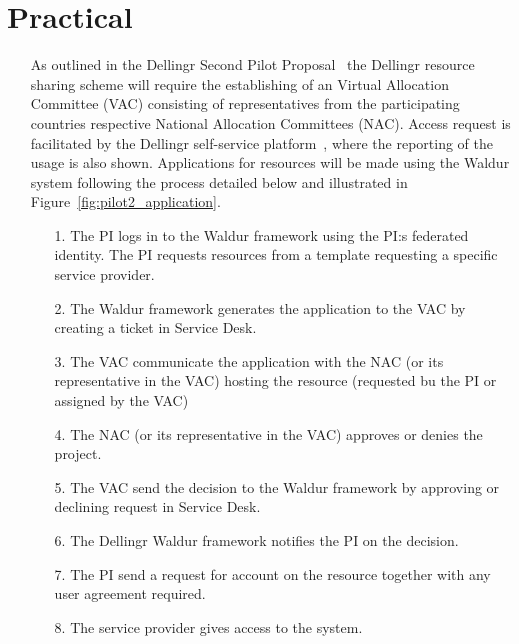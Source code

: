 \documentclass{article}
\newcommand{\dell}{Dellingr\xspace}
\begin{document}
\section{Practical}
\begin{itemize}
    \item []
As outlined in the Dellingr Second Pilot Proposal~\cite{Dellingr_Second_Pilot_Proposal} the \dell resource sharing scheme will require the establishing of an Virtual Allocation Committee (VAC) consisting of representatives from the participating countries respective National Allocation Committees (NAC). Access request is facilitated by the Dellingr self-service platform~\cite{dellingr_platform}, where the reporting of the usage is also shown. Applications for resources will be made using the Waldur system following the process detailed below and illustrated in Figure~\ref{fig:pilot2_application}.
\begin{itemize}
    \item[1.] The PI logs in to the Waldur framework using the PI:s federated identity. The PI requests resources from a template requesting a specific service provider.
    \item[2.] The Waldur framework generates the application to the VAC by creating a ticket in Service Desk.
    \item[3.] The VAC communicate the application with the NAC (or its representative in the VAC) hosting the resource (requested bu the PI or assigned by the VAC)
    \item[4.] The NAC (or its representative in the VAC) approves or denies the project.
    \item[5.] The VAC send the decision to the Waldur framework by approving or declining request in Service Desk.
    \item[6.] The \dell Waldur framework notifies the PI on the decision. 
    \item[7.] The PI send a request for account on the resource together with any user agreement required.
    \item[8.] The service provider gives access to the system.
\end{itemize}


\end{itemize}
\end{document}
